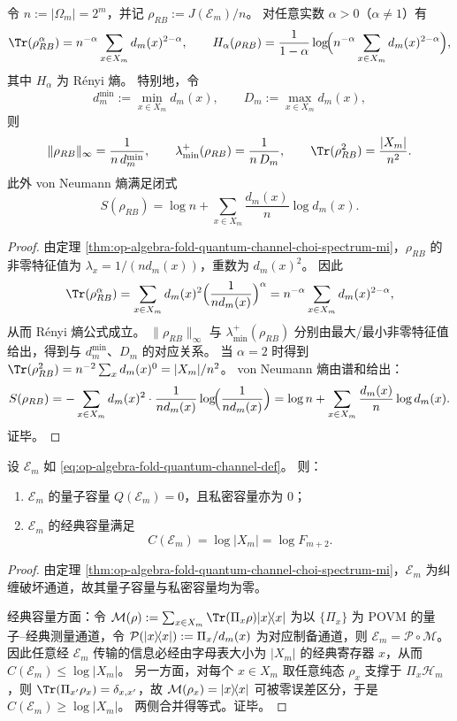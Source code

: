\begin{corollary}\label{cor:op-algebra-fold-quantum-channel-choi-renyi-moments}
令 \(n:=|\Omega_m|=2^m\)，并记 \(\rho_{RB}:=J(\mathcal{E}_m)/n\)。
对任意实数 \(\alpha>0\)（\(\alpha\neq 1\)）有
\[
\Tr(\rho_{RB}^\alpha)=n^{-\alpha}\sum_{x\in X_m} d_m(x)^{2-\alpha},
\qquad
H_\alpha(\rho_{RB})=\frac{1}{1-\alpha}\log\!\Bigl(n^{-\alpha}\sum_{x\in X_m} d_m(x)^{2-\alpha}\Bigr),
\]
其中 \(H_\alpha\) 为 Rényi 熵。
特别地，令
\[
d_m^{\min}:=\min_{x\in X_m}d_m(x),
\qquad
D_m:=\max_{x\in X_m}d_m(x),
\]
则
\[
\|\rho_{RB}\|_\infty=\frac{1}{n\,d_m^{\min}},
\qquad
\lambda_{\min}^{+}(\rho_{RB})=\frac{1}{n\,D_m},
\qquad
\Tr(\rho_{RB}^2)=\frac{|X_m|}{n^2}.
\]
此外 von Neumann 熵满足闭式
\[
S(\rho_{RB})=\log n+\sum_{x\in X_m}\frac{d_m(x)}{n}\log d_m(x).
\]
\end{corollary}
\begin{proof}
由定理 \ref{thm:op-algebra-fold-quantum-channel-choi-spectrum-mi}，\(\rho_{RB}\) 的非零特征值为 \(\lambda_x=1/(n d_m(x))\)，重数为 \(d_m(x)^2\)。
因此
\[
\Tr(\rho_{RB}^\alpha)=\sum_{x\in X_m} d_m(x)^2\Bigl(\frac{1}{n d_m(x)}\Bigr)^\alpha
=n^{-\alpha}\sum_{x\in X_m} d_m(x)^{2-\alpha},
\]
从而 Rényi 熵公式成立。
\(\|\rho_{RB}\|_\infty\) 与 \(\lambda_{\min}^+(\rho_{RB})\) 分别由最大/最小非零特征值给出，得到与 \(d_m^{\min}\)、\(D_m\) 的对应关系。
当 \(\alpha=2\) 时得到
\(
\Tr(\rho_{RB}^2)=n^{-2}\sum_x d_m(x)^{0}=|X_m|/n^2
\)。
von Neumann 熵由谱和给出：
\[
S(\rho_{RB})
=-\sum_{x\in X_m}d_m(x)^2\cdot \frac{1}{n d_m(x)}\log\!\Bigl(\frac{1}{n d_m(x)}\Bigr)
=\log n+\sum_{x\in X_m}\frac{d_m(x)}{n}\log d_m(x).
\]
证毕。
\end{proof}

\begin{theorem}\label{thm:op-algebra-fold-quantum-channel-capacity}
设 \(\mathcal{E}_m\) 如 \eqref{eq:op-algebra-fold-quantum-channel-def}。
则：
\begin{enumerate}
  \item \(\mathcal{E}_m\) 的量子容量 \(Q(\mathcal{E}_m)=0\)，且私密容量亦为 \(0\)；
  \item \(\mathcal{E}_m\) 的经典容量满足
  \[
  C(\mathcal{E}_m)=\log |X_m|=\log F_{m+2}.
  \]
\end{enumerate}
\end{theorem}
\begin{proof}
由定理 \ref{thm:op-algebra-fold-quantum-channel-choi-spectrum-mi}，\(\mathcal{E}_m\) 为纠缠破坏通道，故其量子容量与私密容量均为零。

经典容量方面：令 \(\mathcal{M}(\rho):=\sum_{x\in X_m}\Tr(\Pi_x\rho)\ket{x}\!\bra{x}\) 为以 \(\{\Pi_x\}\) 为 POVM 的量子--经典测量通道，令 \(\mathcal{P}(\lvert x\rangle\!\langle x\rvert):=\Pi_x/d_m(x)\) 为对应制备通道，则 \(\mathcal{E}_m=\mathcal{P}\circ\mathcal{M}\)。
因此任意经 \(\mathcal{E}_m\) 传输的信息必经由字母表大小为 \(|X_m|\) 的经典寄存器 \(x\)，从而 \(C(\mathcal{E}_m)\le \log|X_m|\)。
另一方面，对每个 \(x\in X_m\) 取任意纯态 \(\rho_x\) 支撑于 \(\Pi_x\mathcal{H}_m\)，则 \(\Tr(\Pi_{x'}\rho_x)=\delta_{x,x'}\)，故 \(\mathcal{M}(\rho_x)=\lvert x\rangle\!\langle x\rvert\) 可被零误差区分，于是 \(C(\mathcal{E}_m)\ge \log|X_m|\)。
两侧合并得等式。证毕。
\end{proof}

